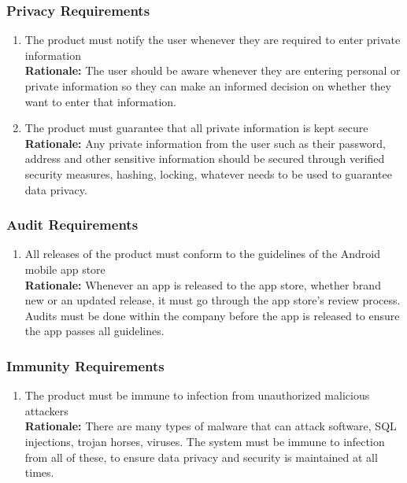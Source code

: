 \documentclass[]{article}
\begin{document}
\subsubsection{Privacy Requirements}
\label{ssub:privacy_requirements}
\begin{enumerate}[{SR-P}1. ]
	\item The product must notify the user whenever they are required to enter private information \\
	{\bf Rationale:} The user should be aware whenever they are entering personal or private information so they can make an informed decision on whether they want to enter that information.
	\item The product must guarantee that all private information is kept secure \\
	{\bf Rationale:} Any private information from the user such as their password, address and other sensitive information should be secured through verified security measures, hashing, locking, whatever needs to be used to guarantee data privacy.
\end{enumerate}

\subsubsection{Audit Requirements}
\label{ssub:audit_requirements}
\begin{enumerate}[{SR-AU}1. ]
	\item All releases of the product must conform to the guidelines of the Android mobile app store \\
	{\bf Rationale:} Whenever an app is released to the app store, whether brand new or an updated release, it must go through the app store's review process. Audits must be done within the company before the app is released to ensure the app passes all guidelines.
\end{enumerate}

\subsubsection{Immunity Requirements}
\label{ssub:immunity_requirements}
\begin{enumerate}[{SR-IM}1. ]
	\item The product must be immune to infection from unauthorized malicious attackers \\
	{\bf Rationale:} There are many types of malware that can attack software, SQL injections, trojan horses, viruses. The system must be immune to infection from all of these, to ensure data privacy and security is maintained at all times.
\end{enumerate}
\end{document}

